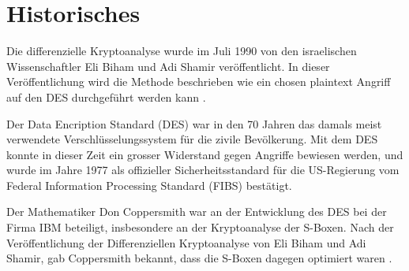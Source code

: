 \section{Historisches}\label{sec:Historisches}

Die differenzielle Kryptoanalyse wurde im Juli 1990 von den israelischen Wissenschaftler Eli Biham und Adi Shamir veröffentlicht. In dieser Veröffentlichung wird die Methode beschrieben wie ein chosen plaintext Angriff auf den DES durchgeführt werden kann \cite{biham_differential_1990}.

Der Data Encription Standard (DES) war in den 70 Jahren das damals meist verwendete Verschlüsselungssystem für die zivile Bevölkerung. Mit dem DES konnte in dieser Zeit ein grosser Widerstand gegen Angriffe bewiesen werden, und wurde im Jahre 1977 als offizieller Sicherheitsstandard für die US-Regierung vom Federal Information Processing Standard (FIBS) bestätigt. 

Der Mathematiker Don Coppersmith war an der Entwicklung des DES bei der Firma IBM beteiligt, insbesondere an der Kryptoanalyse der S-Boxen. Nach der Veröffentlichung der Differenziellen Kryptoanalyse von Eli Biham und Adi Shamir, gab Coppersmith bekannt, dass die S-Boxen dagegen optimiert waren \cite{d_coppersmith_data_1994}.




